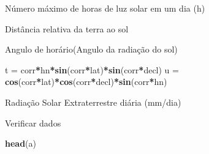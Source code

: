 \documentclass[
]{book}
\newenvironment{Shaded}{\begin{snugshade}}{\end{snugshade}}
\newcommand{\DecValTok}[1]{\textcolor[rgb]{0.00,0.00,0.81}{#1}}
\newcommand{\FloatTok}[1]{\textcolor[rgb]{0.00,0.00,0.81}{#1}}
\newcommand{\KeywordTok}[1]{\textcolor[rgb]{0.13,0.29,0.53}{\textbf{#1}}}
\newcommand{\NormalTok}[1]{#1}
\newcommand{\OperatorTok}[1]{\textcolor[rgb]{0.81,0.36,0.00}{\textbf{#1}}}
\newcommand{\StringTok}[1]{\textcolor[rgb]{0.31,0.60,0.02}{#1}}
\begin{document}
Número máximo de horas de luz solar em um dia (h)

\begin{Shaded}
\end{Shaded}

Distância relativa da terra ao sol

\begin{Shaded}
\end{Shaded}

Angulo de horário(Angulo da radiação do sol)

\begin{Shaded}
\begin{Highlighting}[]
\NormalTok{t =}\StringTok{ }\NormalTok{corr}\OperatorTok{*}\NormalTok{hn}\OperatorTok{*}\KeywordTok{sin}\NormalTok{(corr}\OperatorTok{*}\NormalTok{lat)}\OperatorTok{*}\KeywordTok{sin}\NormalTok{(corr}\OperatorTok{*}\NormalTok{decl) }
\NormalTok{u =}\StringTok{ }\KeywordTok{cos}\NormalTok{(corr}\OperatorTok{*}\NormalTok{lat)}\OperatorTok{*}\KeywordTok{cos}\NormalTok{(corr}\OperatorTok{*}\NormalTok{decl)}\OperatorTok{*}\KeywordTok{sin}\NormalTok{(corr}\OperatorTok{*}\NormalTok{hn)}
\end{Highlighting}
\end{Shaded}

Radiação Solar Extraterrestre diária (mm/dia)

\begin{Shaded}
\end{Shaded}

Verificar dados

\begin{Shaded}
\begin{Highlighting}[]
\KeywordTok{head}\NormalTok{(a)}
\end{Highlighting}
\end{Shaded}
\end{document}
